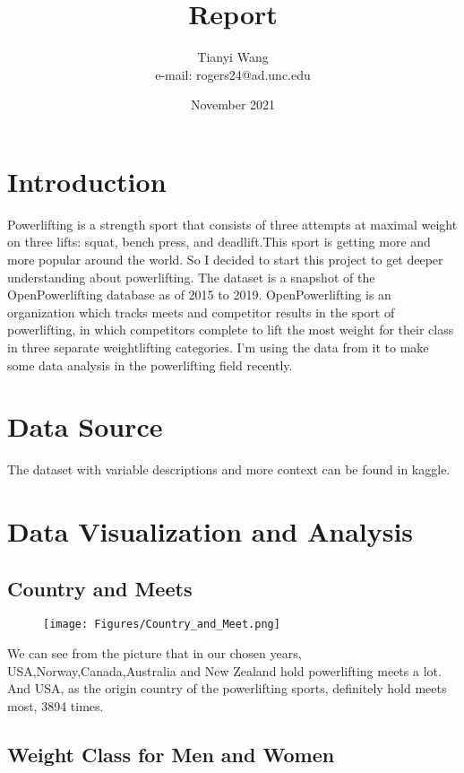 \documentclass{article}
\title{Report}
\author{Tianyi Wang \\ e-mail: rogers24@ad.unc.edu}
\date{November 2021}
\begin{document}
\maketitle

\section{Introduction}

Powerlifting is a strength sport that consists of three attempts at maximal weight on three lifts: squat, bench press, and deadlift.This sport is getting more and more popular around the world. So I decided to start this project to get deeper understanding about powerlifting. The dataset is a snapshot of the OpenPowerlifting database as of 2015 to 2019. OpenPowerlifting is an organization which tracks meets and competitor results in the sport of powerlifting, in which competitors complete to lift the most weight for their class in three separate weightlifting categories. I'm using the data from it to make some data analysis in the powerlifting field recently.

\section{Data Source}

The dataset with variable descriptions and more context can be found in kaggle.

\section{Data Visualization and Analysis}

\subsection{Country and Meets}

	\begin{figure}[H]
	\centering
	\texttt{[image: Figures/Country\_and\_Meet.png]}
	\end{figure}

We can see from the picture that in our chosen years, USA,Norway,Canada,Australia and New Zealand hold powerlifting meets a lot. And USA, as the origin country of the powerlifting sports, definitely hold meets most, 3894 times. 


\subsection{Weight Class for Men and Women}
\end{document}
